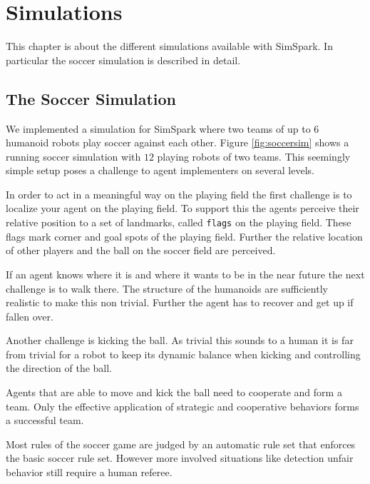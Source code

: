 \chapter{Simulations}
\label{cha:simulations}
This chapter is about the different simulations available with
SimSpark. In particular the soccer simulation is described in detail.\newline





\section{The Soccer Simulation}
\label{sec:soccersimulation}
We implemented a simulation for SimSpark where two teams of up to 6
humanoid robots play soccer against each other.
Figure \ref{fig:soccersim} shows a running soccer simulation with $12$ playing
robots of two teams. This seemingly simple setup poses a challenge to agent
implementers on several levels.

In order to act in a meaningful way on the playing field the first
challenge is to localize your agent on the playing field. To support
this the agents perceive their relative position to a set of
landmarks, called \texttt{flags} on the playing field. These flags
mark corner and goal spots of the playing field. Further the relative
location of other players and the ball on the soccer field are perceived.

If an agent knows where it is and where it wants to be in the near
future the next challenge is to walk there. The structure of the
humanoids are sufficiently realistic to make this non trivial. Further
the agent has to recover and get up if fallen over.

Another challenge is kicking the ball. As trivial this sounds to a
human it is far from trivial for a robot to keep its dynamic balance
when kicking and controlling the direction of the ball.

Agents that are able to move and kick the ball need to cooperate and
form a team. Only the effective application of strategic and
cooperative behaviors forms a successful team.

Most rules of the soccer game are judged by an automatic rule set that
enforces the basic soccer rule set. However more involved situations
like detection unfair behavior still require a human referee.\newline

